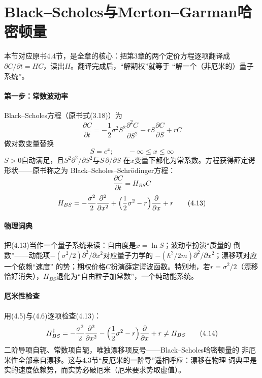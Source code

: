 \section{Black--Scholes与Merton--Garman哈密顿量}

本节对应原书4.4节，是全章的核心：把第3章的两个定价方程逐项翻译成
$\partial C/\partial t=HC$，读出$H$。翻译完成后，“解期权”就等于
“解一个（非厄米的）量子系统”。

\paragraph{第一步：常数波动率}
Black--Scholes方程（原书式(3.18)）为
\begin{equation*}
\frac{\partial C}{\partial t}
=-\frac{1}{2}\sigma^{2}S^{2}\frac{\partial^{2}C}{\partial S^{2}}
-rS\frac{\partial C}{\partial S}+rC
\tag{4.11}
\end{equation*}
做对数变量替换
\begin{equation*}
S=e^{x};\qquad -\infty\leq x\leq\infty
\end{equation*}
$S>0$自动满足，且$S^{2}\partial^{2}/\partial S^{2}$与$S\,\partial/\partial S$
在$x$变量下都化为常系数。方程获得薛定谔形状——原书称之为
Black--Scholes--Schr\"odinger方程：
\begin{equation*}
\frac{\partial C}{\partial t}=H_{BS}C
\tag{4.12}
\end{equation*}
\begin{equation*}
H_{BS}=-\frac{\sigma^{2}}{2}\frac{\partial^{2}}{\partial x^{2}}
+\Bigl(\frac{1}{2}\sigma^{2}-r\Bigr)\frac{\partial}{\partial x}+r
\tag{4.13}
\end{equation*}

\paragraph{物理词典}
把(4.13)当作一个量子系统来读：自由度是$x=\ln S$；波动率扮演“质量的
倒数”——动能项$-(\sigma^{2}/2)\partial^{2}/\partial x^{2}$对应量子力学的
$-(\hbar^{2}/2m)\partial^{2}/\partial x^{2}$；漂移项对应一个依赖“速度”
的势；期权价格$C$扮演薛定谔波函数。特别地，若$r=\sigma^{2}/2$（漂移
恰好消失），$H_{BS}$退化为“自由粒子加常数”，一个纯动能系统。

\paragraph{厄米性检查}
用(4.5)与(4.6)逐项检查(4.13)：
\begin{equation*}
H_{BS}^{\dagger}
=-\frac{\sigma^{2}}{2}\frac{\partial^{2}}{\partial x^{2}}
-\Bigl(\frac{1}{2}\sigma^{2}-r\Bigr)\frac{\partial}{\partial x}+r
\neq H_{BS}
\tag{4.14}
\end{equation*}
二阶导项自轭、常数项自轭，唯独漂移项反号——Black--Scholes哈密顿量的
非厄米性全部来自漂移。这与4.3节“反厄米的一阶导”遥相呼应：漂移在物理
词典里是实的速度依赖势，而实势必破厄米（厄米要求势取虚值）。

